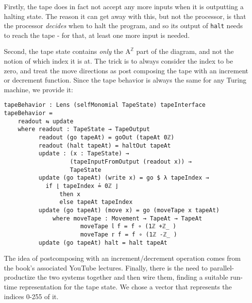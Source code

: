 Firstly, the tape does in fact not accept any more inputs when it is outputting a halting state. The reason it can get away with this, but not the processor, is that the processor \textit{decides} when to halt the program, and so its output of \texttt{halt} needs to reach the tape - for that, at least one more input is needed.

Second, the tape state contains \textit{only} the $\text{A}^{\mathbb{Z}}$ part of the diagram, and not the notion of which index it is at. The trick is to always consider the index to be zero, and treat the move directions as post composing the tape with an increment or decrement function. Since the tape behavior is always the same for any Turing machine, we provide it:

\begin{verbatim}
tapeBehavior : Lens (selfMonomial TapeState) tapeInterface
tapeBehavior = 
    readout ⇆ update
    where readout : TapeState → TapeOutput
          readout (go tapeAt) = goOut (tapeAt 0ℤ)
          readout (halt tapeAt) = haltOut tapeAt 
          update : (x : TapeState) → 
                   (tapeInputFromOutput (readout x)) → 
                   TapeState
          update (go tapeAt) (write x) = go $ λ tapeIndex → 
            if ⌊ tapeIndex ≟ 0ℤ ⌋ 
                then x 
                else tapeAt tapeIndex
          update (go tapeAt) (move x) = go (moveTape x tapeAt)
              where moveTape : Movement → TapeAt → TapeAt
                      moveTape 𝕝 f = f ∘ (1ℤ +ℤ_ )
                      moveTape 𝕣 f = f ∘ (1ℤ -ℤ_ )
          update (go tapeAt) halt = halt tapeAt
\end{verbatim}

The idea of postcomposing with an increment/decrement operation comes from the book's associated YouTube lectures. Finally, there is the need to parallel-productize the two systems together and then wire them, finding a suitable run-time representation for the tape state. We chose a vector that represents the indices 0-255 of it.

